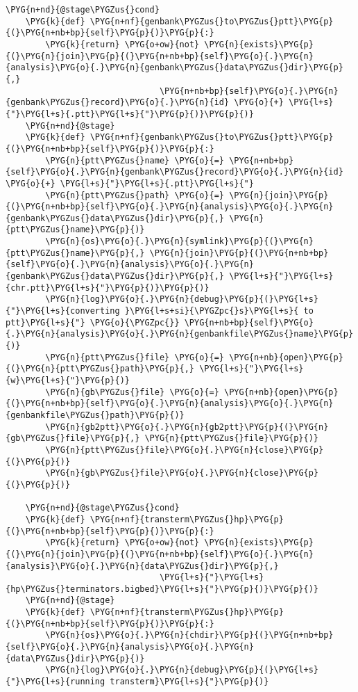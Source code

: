\begin{Verbatim}[commandchars=\\\{\}]
    \PYG{n+nd}{@stage\PYGZus{}cond}
    \PYG{k}{def} \PYG{n+nf}{genbank\PYGZus{}to\PYGZus{}ptt}\PYG{p}{(}\PYG{n+nb+bp}{self}\PYG{p}{)}\PYG{p}{:}
        \PYG{k}{return} \PYG{o+ow}{not} \PYG{n}{exists}\PYG{p}{(}\PYG{n}{join}\PYG{p}{(}\PYG{n+nb+bp}{self}\PYG{o}{.}\PYG{n}{analysis}\PYG{o}{.}\PYG{n}{genbank\PYGZus{}data\PYGZus{}dir}\PYG{p}{,}
                               \PYG{n+nb+bp}{self}\PYG{o}{.}\PYG{n}{genbank\PYGZus{}record}\PYG{o}{.}\PYG{n}{id} \PYG{o}{+} \PYG{l+s}{"}\PYG{l+s}{.ptt}\PYG{l+s}{"}\PYG{p}{)}\PYG{p}{)}
    \PYG{n+nd}{@stage}
    \PYG{k}{def} \PYG{n+nf}{genbank\PYGZus{}to\PYGZus{}ptt}\PYG{p}{(}\PYG{n+nb+bp}{self}\PYG{p}{)}\PYG{p}{:}
        \PYG{n}{ptt\PYGZus{}name} \PYG{o}{=} \PYG{n+nb+bp}{self}\PYG{o}{.}\PYG{n}{genbank\PYGZus{}record}\PYG{o}{.}\PYG{n}{id} \PYG{o}{+} \PYG{l+s}{"}\PYG{l+s}{.ptt}\PYG{l+s}{"}
        \PYG{n}{ptt\PYGZus{}path} \PYG{o}{=} \PYG{n}{join}\PYG{p}{(}\PYG{n+nb+bp}{self}\PYG{o}{.}\PYG{n}{analysis}\PYG{o}{.}\PYG{n}{genbank\PYGZus{}data\PYGZus{}dir}\PYG{p}{,} \PYG{n}{ptt\PYGZus{}name}\PYG{p}{)}
        \PYG{n}{os}\PYG{o}{.}\PYG{n}{symlink}\PYG{p}{(}\PYG{n}{ptt\PYGZus{}name}\PYG{p}{,} \PYG{n}{join}\PYG{p}{(}\PYG{n+nb+bp}{self}\PYG{o}{.}\PYG{n}{analysis}\PYG{o}{.}\PYG{n}{genbank\PYGZus{}data\PYGZus{}dir}\PYG{p}{,} \PYG{l+s}{"}\PYG{l+s}{chr.ptt}\PYG{l+s}{"}\PYG{p}{)}\PYG{p}{)}
        \PYG{n}{log}\PYG{o}{.}\PYG{n}{debug}\PYG{p}{(}\PYG{l+s}{"}\PYG{l+s}{converting }\PYG{l+s+si}{\PYGZpc{}s}\PYG{l+s}{ to ptt}\PYG{l+s}{"} \PYG{o}{\PYGZpc{}} \PYG{n+nb+bp}{self}\PYG{o}{.}\PYG{n}{analysis}\PYG{o}{.}\PYG{n}{genbankfile\PYGZus{}name}\PYG{p}{)}
        \PYG{n}{ptt\PYGZus{}file} \PYG{o}{=} \PYG{n+nb}{open}\PYG{p}{(}\PYG{n}{ptt\PYGZus{}path}\PYG{p}{,} \PYG{l+s}{"}\PYG{l+s}{w}\PYG{l+s}{"}\PYG{p}{)}
        \PYG{n}{gb\PYGZus{}file} \PYG{o}{=} \PYG{n+nb}{open}\PYG{p}{(}\PYG{n+nb+bp}{self}\PYG{o}{.}\PYG{n}{analysis}\PYG{o}{.}\PYG{n}{genbankfile\PYGZus{}path}\PYG{p}{)}
        \PYG{n}{gb2ptt}\PYG{o}{.}\PYG{n}{gb2ptt}\PYG{p}{(}\PYG{n}{gb\PYGZus{}file}\PYG{p}{,} \PYG{n}{ptt\PYGZus{}file}\PYG{p}{)}
        \PYG{n}{ptt\PYGZus{}file}\PYG{o}{.}\PYG{n}{close}\PYG{p}{(}\PYG{p}{)}
        \PYG{n}{gb\PYGZus{}file}\PYG{o}{.}\PYG{n}{close}\PYG{p}{(}\PYG{p}{)}

    \PYG{n+nd}{@stage\PYGZus{}cond}
    \PYG{k}{def} \PYG{n+nf}{transterm\PYGZus{}hp}\PYG{p}{(}\PYG{n+nb+bp}{self}\PYG{p}{)}\PYG{p}{:}
        \PYG{k}{return} \PYG{o+ow}{not} \PYG{n}{exists}\PYG{p}{(}\PYG{n}{join}\PYG{p}{(}\PYG{n+nb+bp}{self}\PYG{o}{.}\PYG{n}{analysis}\PYG{o}{.}\PYG{n}{data\PYGZus{}dir}\PYG{p}{,}
                               \PYG{l+s}{"}\PYG{l+s}{hp\PYGZus{}terminators.bigbed}\PYG{l+s}{"}\PYG{p}{)}\PYG{p}{)}
    \PYG{n+nd}{@stage}
    \PYG{k}{def} \PYG{n+nf}{transterm\PYGZus{}hp}\PYG{p}{(}\PYG{n+nb+bp}{self}\PYG{p}{)}\PYG{p}{:}
        \PYG{n}{os}\PYG{o}{.}\PYG{n}{chdir}\PYG{p}{(}\PYG{n+nb+bp}{self}\PYG{o}{.}\PYG{n}{analysis}\PYG{o}{.}\PYG{n}{data\PYGZus{}dir}\PYG{p}{)}
        \PYG{n}{log}\PYG{o}{.}\PYG{n}{debug}\PYG{p}{(}\PYG{l+s}{"}\PYG{l+s}{running transterm}\PYG{l+s}{"}\PYG{p}{)}


\end{Verbatim}
